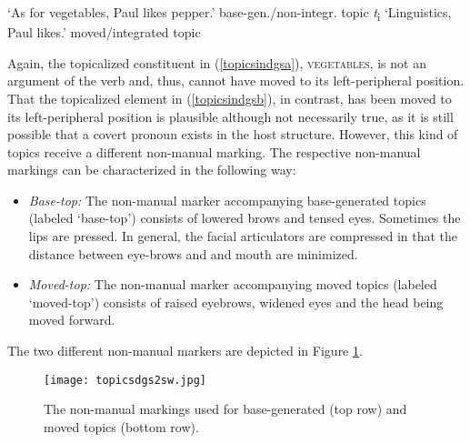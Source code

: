 \begin{exe}
\ex\label{topicsindgs}\begin{xlist}
\ex {} 
%
\glt `As for vegetables, Paul likes pepper.' \label{topicsindgsa} \hfill base-gen./non-integr. topic
\ex {}  \textit{t}\textsubscript{i} 
%
\glt `Linguistics, Paul likes.' \label{topicsindgsb} \hfill moved/integrated topic
\end{xlist}
\end{exe}


\noindent Again, the topicalized constituent in (\ref{topicsindgsa}), \textsc{vegetables}, is not an argument of the verb and, thus, cannot have moved to its left-peripheral position. That the topicalized element in (\ref{topicsindgsb}), in contrast, has been moved to its left-peripheral position is plausible although not necessarily true, as it is still possible that a covert pronoun exists in the host structure. However, this kind of topics receive a different non-manual marking. The respective non-manual markings can be characterized in the following way:

\begin{itemize}[itemsep=0pt]
	\item \textit{Base-top:} The non-manual marker accompanying base-generated topics (labeled `base-top') consists of lowered brows and tensed eyes. Sometimes the lips are pressed. In general, the facial articulators are compressed in that the distance between eye-brows and and mouth are minimized.
	\item \textit{Moved-top:} The non-manual marker accompanying moved topics (labeled `moved-top') consists of raised eyebrows, widened eyes and the head being moved forward.
\end{itemize}

\noindent The two different non-manual markers are depicted in Figure \ref{topicsindgspicture}.

\begin{figure}[bt]
\centering
	\texttt{[image: topicsdgs2sw.jpg]}
	\caption{The non-manual markings used for base-generated (top row) and moved topics (bottom row).}
	\label{topicsindgspicture}
\end{figure}

